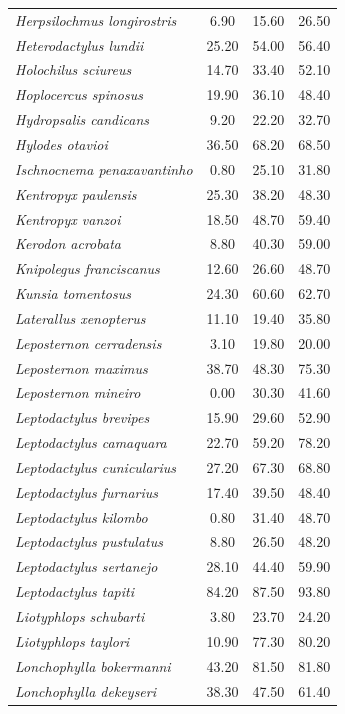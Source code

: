 \documentclass[12pt,openright,oneside,a4paper,english]{abntex2}
\begin{document}
\begin{longtable}{lccc}
	\textit{Herpsilochmus longirostris}&6.90 &15.60 &26.50 \\
	\textit{Heterodactylus lundii}&25.20 &54.00 &56.40 \\
	\textit{Holochilus sciureus}&14.70 &33.40 &52.10 \\
	\textit{Hoplocercus spinosus}&19.90 &36.10 &48.40 \\
	\textit{Hydropsalis candicans}&9.20 &22.20 &32.70 \\
	\textit{Hylodes otavioi}&36.50 &68.20 &68.50 \\
	\textit{Ischnocnema penaxavantinho}&0.80 &25.10 &31.80 \\
	\textit{Kentropyx paulensis}&25.30 &38.20 &48.30 \\
	\textit{Kentropyx vanzoi}&18.50 &48.70 &59.40 \\
	\textit{Kerodon acrobata}&8.80 &40.30 &59.00 \\
	\textit{Knipolegus franciscanus}&12.60 &26.60 &48.70 \\
	\textit{Kunsia tomentosus}&24.30 &60.60 &62.70 \\
	\textit{Laterallus xenopterus}&11.10 &19.40 &35.80 \\
	\textit{Leposternon cerradensis}&3.10 &19.80 &20.00 \\
	\textit{Leposternon maximus}&38.70 &48.30 &75.30 \\
	\textit{Leposternon mineiro}&0.00 &30.30 &41.60 \\
	\textit{Leptodactylus brevipes}&15.90 &29.60 &52.90 \\
	\textit{Leptodactylus camaquara}&22.70 &59.20 &78.20 \\
	\textit{Leptodactylus cunicularius}&27.20 &67.30 &68.80 \\
	\textit{Leptodactylus furnarius}&17.40 &39.50 &48.40 \\
	\textit{Leptodactylus kilombo}&0.80 &31.40 &48.70 \\
	\textit{Leptodactylus pustulatus}&8.80 &26.50 &48.20 \\
	\textit{Leptodactylus sertanejo}&28.10 &44.40 &59.90 \\
	\textit{Leptodactylus tapiti}&84.20 &87.50 &93.80 \\
	\textit{Liotyphlops schubarti}&3.80 &23.70 &24.20 \\
	\textit{Liotyphlops taylori}&10.90 &77.30 &80.20 \\
	\textit{Lonchophylla bokermanni}&43.20 &81.50 &81.80 \\
	\textit{Lonchophylla dekeyseri}&38.30 &47.50 &61.40 \\

\end{longtable}
\end{document}
